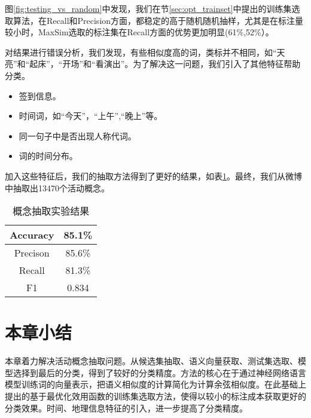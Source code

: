 图\ref{fig:testing_vs_random}中发现，我们在节\ref{sec:opt_trainset}中提出的训练集选取算法，在Recall和Precision方面，都稳定的高于随机随机抽样，尤其是在标注量较小时，MaxSim选取的标注集在Recall方面的优势更加明显(61\%,52\%）。

对结果进行错误分析，我们发现，有些相似度高的词，类标并不相同，如``天亮''和``起床''，``开场''和``看演出''。为了解决这一问题，我们引入了其他特征帮助分类。
\begin{itemize}
\item 签到信息。
\item 时间词，如``今天''，``上午'',``晚上''等。
\item 同一句子中是否出现人称代词。
\item 词的时间分布。
\end{itemize}
加入这些特征后，我们的抽取方法得到了更好的结果，如表\ref{table:concept}。最终，我们从微博中抽取出13470个活动概念。

\begin{table}
\centering
\begin{tabular}{|c|c|}
\hline
Accuracy & 85.1\% \\
\hline
Precison & 85.6\% \\
\hline
Recall & 81.3\% \\
\hline
F1 & 0.834 \\
\hline
\end{tabular}
\caption{概念抽取实验结果}
\label{table:concept}
\end{table}

\section{本章小结}
本章着力解决活动概念抽取问题。从候选集抽取、语义向量获取、测试集选取、模型选择到最后的分类，得到了较好的分类精度。方法的核心在于通过神经网络语言模型训练词的向量表示，把语义相似度的计算简化为计算余弦相似度。在此基础上提出的基于最优化效用函数的训练集选取方法，使得以较小的标注成本获取更好的分类效果。时间、地理信息特征的引入，进一步提高了分类精度。

